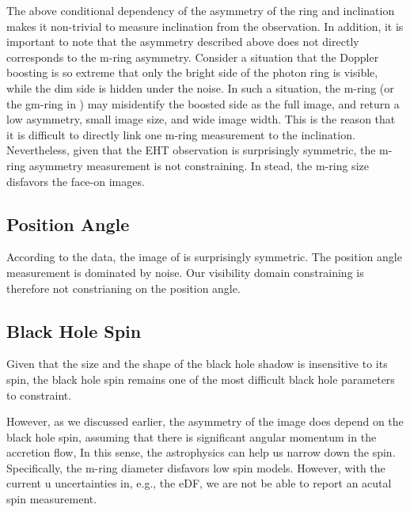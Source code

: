 The above conditional dependency of the asymmetry of the ring and
inclination makes it non-trivial to measure inclination from the
observation.
In addition, it is important to note that the asymmetry described
above does not directly corresponds to the m-ring asymmetry.
Consider a situation that the Doppler boosting is so extreme that only
the bright side of the photon ring is visible, while the dim side is
hidden under the noise.
In such a situation, the m-ring (or the gm-ring in )
may misidentify the boosted side as the full image, and return a low
asymmetry, small image size, and wide image width.
This is the reason that it is difficult to directly link one m-ring
measurement to the inclination.
Nevertheless, given that the EHT observation is surprisingly
symmetric, the m-ring asymmetry measurement is not constraining.
In stead, the m-ring size disfavors the face-on images.

\subsection{Position Angle}


According to the data, the image of \sgra is surprisingly symmetric.
The position angle measurement is dominated by noise.
Our visibility domain constraining is therefore not constrianing on
the position angle.

\subsection{Black Hole Spin}


Given that the size and the shape of the black hole shadow is
insensitive to its spin, the black hole spin remains one of the most
difficult black hole parameters to constraint.

However, as we discussed earlier, the asymmetry of the image does
depend on the black hole spin, assuming that there is significant
angular momentum in the accretion flow, In this sense, the
astrophysics can help us narrow down the spin.
Specifically, the m-ring diameter disfavors low spin models.
However, with the current u uncertainties in, e.g., the eDF, we are
not be able to report an acutal spin measurement.


